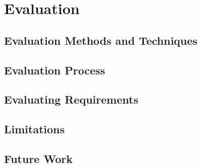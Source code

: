 \chapter{Evaluation}
\label{chap:evaluation}

\section{Evaluation Methods and Techniques}
\label{evaluation:methods-and-technicques}

\section{Evaluation Process}
\label{evaluation:process}

\section{Evaluating Requirements}
\label{evaluation:requirements}

\section{Limitations}
\label{evaluation:limitations}

\section{Future Work}
\label{evaluation:future}